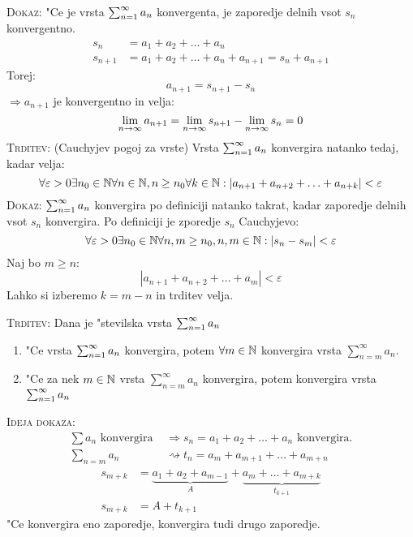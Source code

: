 \textsc{Dokaz:} "Ce je vrsta $\sum_{n = 1}^{\infty} a_n$ konvergenta, je zaporedje delnih vsot $s_n$ konvergentno.
\begin{align*}
s_n &= a_1 + a_2 + \ldots + a_n \\
s_{n+1} &= a_1 + a_2 + \ldots + a_n + a_{n+1} = s_n + a_{n+1}
\end{align*}
Torej:
\begin{equation*}
a_{n+1}  = s_{n+1} - s_n
\end{equation*}
$\Rightarrow a_{n+1}$ je konvergentno in velja:
\begin{equation*}
\lim_{n \rightarrow \infty} a_{n+1} = \lim_{n \rightarrow \infty} s_{n+1} - \lim_{n \rightarrow \infty} s_n = 0
\end{equation*}
\textsc{Trditev:} (Cauchyjev pogoj za vrste) Vrsta $\sum_{n = 1}^{\infty}a_n$ konvergira natanko tedaj, kadar velja:
\begin{equation*}
\forall \varepsilon > 0 \exists n_0 \in \mathbb{N} \forall n \in \mathbb{N}, n \geq n_0 \forall k \in \mathbb{N}: |a_{n+1} + a_{n+2} + \ldots + a_{n+k}| < \varepsilon
\end{equation*}
\textsc{Dokaz:} $\sum_{n = 1}^{\infty}a_n$ konvergira po definiciji natanko takrat, kadar zaporedje delnih vsot $s_n$ konvergira. Po definiciji je zporedje $s_n$ Cauchyjevo:
\begin{equation*}
\forall \varepsilon > 0 \exists n_0 \in \mathbb{N} \forall n, m \geq n_0, n, m \in \mathbb{N}: |s_n - s_m| < \varepsilon
\end{equation*}
Naj bo $m \geq n$:
\begin{equation*}
|a_{n+1} + a_{n+2} + \ldots + a_m| < \varepsilon
\end{equation*}
Lahko si izberemo $k = m-n$ in trditev velja.

\textsc{Trditev:} Dana je "stevilska vrsta $\sum_{n = 1}^{\infty} a_n$
\begin{enumerate}[(1)]
	\item "Ce vrsta $\sum_{n = 1}^{\infty} a_n$ konvergira, potem $\forall m \in \mathbb{N}$ konvergira vrsta $\sum_{n=m}^{\infty}a_n$.
	\item "Ce za nek $m \in \mathbb{N}$ vrsta $\sum_{n=m}^{\infty} a_n$ konvergira, potem konvergira vrsta $\sum_{n = 1}^{\infty}a_n$
\end{enumerate}
\textsc{Ideja dokaza:} 
\begin{align*}
\sum a_n \text{ konvergira } &\Rightarrow s_n = a_1 + a_2 + \ldots + a_n  \text{ konvergira.} \\
\sum_{n=m}a_n &\rightsquigarrow t_n = a_m + a_{m+1} + \ldots + a_{m+n}
\end{align*}
\begin{align*}
s_{m+k} &= \underbrace{a_1 + a_2 + a_{m-1}}_{A} + \underbrace{a_m + \ldots + a_{m+k}}_{t_{k + 1}} \\
s_{m+k} &= A + t_{k+1}
\end{align*}
"Ce konvergira eno zaporedje, konvergira tudi drugo zaporedje.

